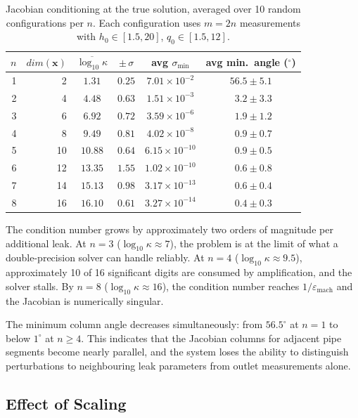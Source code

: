 \begin{table}[htbp]
\centering
\caption{Jacobian conditioning at the true solution, averaged over 10 random configurations per $n$. Each configuration uses $m = 2n$ measurements with $h_0 \in [1.5, 20]$, $q_0 \in [1.5, 12]$.}
\label{tab:jacobian-cond}
\begin{tabular}{r r c c c c}
\toprule
$n$ & $dim(\mathbf{x})$ & $\overline{\log_{10} \kappa}$ & $\pm\, \sigma$ & avg $\sigma_{\min}$ & avg min.\ angle ($^\circ$) \\
\midrule
1 &  2 & $ 1.31$ & $0.25$ & $7.01 \times 10^{-2}$ & $56.5 \pm 5.1$ \\
2 &  4 & $ 4.48$ & $0.63$ & $1.51 \times 10^{-3}$ & $\phantom{0}3.2 \pm 3.3$ \\
3 &  6 & $ 6.92$ & $0.72$ & $3.59 \times 10^{-6}$ & $\phantom{0}1.9 \pm 1.2$ \\
4 &  8 & $ 9.49$ & $0.81$ & $4.02 \times 10^{-8}$ & $\phantom{0}0.9 \pm 0.7$ \\
5 & 10 & $10.88$ & $0.64$ & $6.15 \times 10^{-10}$ & $\phantom{0}0.9 \pm 0.5$ \\
6 & 12 & $13.35$ & $1.55$ & $1.02 \times 10^{-10}$ & $\phantom{0}0.6 \pm 0.8$ \\
7 & 14 & $15.13$ & $0.98$ & $3.17 \times 10^{-13}$ & $\phantom{0}0.6 \pm 0.4$ \\
8 & 16 & $16.10$ & $0.61$ & $3.27 \times 10^{-14}$ & $\phantom{0}0.4 \pm 0.3$ \\
\bottomrule
\end{tabular}
\end{table}

The condition number grows by approximately two orders of magnitude per additional leak.
At $n = 3$ ($\log_{10} \kappa \approx 7$), the problem is at the limit of what a double-precision solver can handle reliably.
At $n = 4$ ($\log_{10} \kappa \approx 9.5$), approximately 10 of 16 significant digits are consumed by amplification, and the solver stalls.
By $n = 8$ ($\log_{10} \kappa \approx 16$), the condition number reaches $1/\varepsilon_{\mathrm{mach}}$ and the Jacobian is numerically singular.

The minimum column angle decreases simultaneously: from $56.5^\circ$ at $n = 1$ to below $1^\circ$ at $n \geq 4$.
This indicates that the Jacobian columns for adjacent pipe segments become nearly parallel, and the system loses the ability to distinguish perturbations to neighbouring leak parameters from outlet measurements alone.


\subsection{Effect of Scaling}

